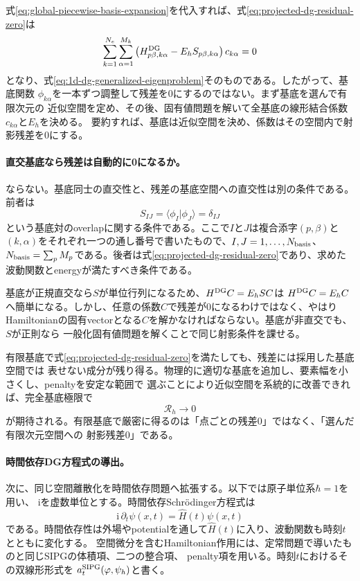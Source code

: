 \documentclass[11pt,a4paper]{article}
\begin{document}
式\eqref{eq:global-piecewise-basis-expansion}を代入すれば、式\eqref{eq:projected-dg-residual-zero}は
\begin{equation}
 \sum_{k=1}^{N_e}\sum_{\alpha=1}^{M_k}
 \left(H^{\rm DG}_{p\beta,k\alpha}-E_hS_{p\beta,k\alpha}\right)c_{k\alpha}=0
 \label{eq:projected-residual-matrix-form}
\end{equation}
となり、式\eqref{eq:1d-dg-generalized-eigenproblem}そのものである。したがって、基底関数
$\phi_{k\alpha}$を一本ずつ調整して残差を0にするのではない。まず基底を選んで有限次元の
近似空間を定め、その後、固有値問題を解いて全基底の線形結合係数$c_{k\alpha}$と$E_h$を決める。
要約すれば、基底は近似空間を決め、係数はその空間内で射影残差を0にする。

\paragraph{直交基底なら残差は自動的に0になるか。}
ならない。基底同士の直交性と、残差の基底空間への直交性は別の条件である。前者は
\begin{equation}
 S_{IJ}=\langle\phi_I|\phi_J\rangle=\delta_{IJ}
 \label{eq:orthonormal-basis-overlap}
\end{equation}
という基底対のoverlapに関する条件である。ここで$I$と$J$は複合添字$(p,\beta)$と
$(k,\alpha)$をそれぞれ一つの通し番号で書いたもので、$I,J=1,\ldots,N_{\rm basis}$、
$N_{\rm basis}=\sum_pM_p$である。後者は式\eqref{eq:projected-dg-residual-zero}であり、求めた
波動関数とenergyが満たすべき条件である。

基底が正規直交なら$S$が単位行列になるため、$H^{\rm DG}C=E_hSC$は
$H^{\rm DG}C=E_hC$へ簡単になる。しかし、任意の係数$C$で残差が0になるわけではなく、やはり
Hamiltonianの固有vectorとなる$C$を解かなければならない。基底が非直交でも、$S$が正則なら
一般化固有値問題を解くことで同じ射影条件を課せる。

有限基底で式\eqref{eq:projected-dg-residual-zero}を満たしても、残差には採用した基底空間では
表せない成分が残り得る。物理的に適切な基底を追加し、要素幅を小さくし、penaltyを安定な範囲で
選ぶことにより近似空間を系統的に改善できれば、完全基底極限で
\begin{equation}
 \mathcal R_h\longrightarrow0
 \label{eq:complete-basis-residual-limit}
\end{equation}
が期待される。有限基底で厳密に得るのは「点ごとの残差0」ではなく、「選んだ有限次元空間への
射影残差0」である。

\paragraph{時間依存DG方程式の導出。}
次に、同じ空間離散化を時間依存問題へ拡張する。以下では原子単位系$\hbar=1$を用い、
$\mathrm i$を虚数単位とする。時間依存Schr\"odinger方程式は
\begin{equation}
 \mathrm i\,\partial_t\psi(x,t)=\hat H(t)\psi(x,t)
 \label{eq:time-dependent-strong}
\end{equation}
である。時間依存性は外場やpotentialを通して$\hat H(t)$に入り、波動関数も時刻$t$とともに変化する。
空間微分を含むHamiltonian作用には、定常問題で導いたものと同じSIPGの体積項、二つの整合項、
penalty項を用いる。時刻$t$におけるその双線形形式を
$a_t^{\rm SIPG}(\varphi,\psi_h)$と書く。
\end{document}
